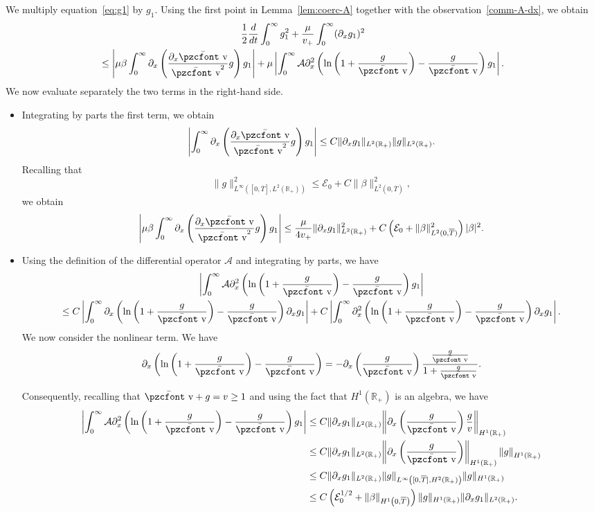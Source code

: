 \documentclass[10pt]{amsart}
\theoremstyle{definition}\newtheorem{defi}[theo]{Definition}\newtheorem{rema}[theo]{Remark}\newtheorem{exam}[theo]{Example}\newtheorem{exem}[theo]{Example}\newtheorem{nota}[theo]{Notation}
\newcommand{\mathpzc}[1]{\text{\pzcfont #1}}
\newcommand{\R}{\mathbb{R}}
\newcommand{\p}{\partial}
\newcommand{\bv}{\bar{\mathpzc{v}}}
\newcommand{\cA}{\mathcal A}
\newcommand{\cE}{\mathcal E}
\begin{document}
We multiply equation~\eqref{eq:g1} by $g_1$. Using the first point in Lemma~\ref{lem:coerc-A} together with the observation~\eqref{comm-A-dx}, we obtain
\begin{multline}\label{eq:energ-g1-0}
\frac{1}{2}\frac{d}{dt}\int_0^\infty g_1^2 + \frac{\mu}{v_+}\int_0^\infty (\p_x g_1)^2\\
\leq \left| \mu \beta \int_0^\infty\p_x \left(\frac{\p_x \bv}{\bv^2} g\right) g_1\right|
+ \mu \left| \int_0^\infty\cA \p_x^2 \left(\ln\left(1+ \frac{g}{\bv}\right) - \frac{g}{\bv}\right) g_1\right|.
\end{multline}
We now evaluate separately the two terms in the right-hand side.
\begin{itemize}
\item Integrating by parts the first term, we obtain
\[
\left| \int_0^\infty\p_x \left(\frac{\p_x \bv}{\bv^2} g\right) g_1\right|\leq C \|\p_x g_1\|_{L^2(\R_+)}\|g\|_{L^2(\R_+)}.
\]
Recalling that
\[
\|g\|_{L^\infty([0,\overline{T}], L^2(\R_+))}^2\leq \cE_0 + C\|\beta\|_{L^2\left(0, \overline{T}\right)}^2,
\]
we obtain
\[
\left| \mu \beta \int_0^\infty\p_x \left(\frac{\p_x \bv}{\bv^2} g\right) g_1\right|\leq \frac{\mu}{4v_+}\|\p_x g_1\|_{L^2(\R_+)}^2 + C\left(\cE_0 + \|\beta\|_{L^2(0, \overline{T})}^2\right)|\beta|^2.
\]

\item Using the definition of the differential operator $\cA$ and integrating by parts, we have
\begin{multline*}
\left| \int_0^\infty\cA \p_x^2 \left(\ln\left(1+ \frac{g}{\bv}\right) - \frac{g}{\bv}\right) g_1\right|\\
\leq C \left| \int_0^\infty \p_x \left(\ln\left(1+ \frac{g}{\bv}\right) - \frac{g}{\bv}\right) \p_x g_1\right|+ C \left| \int_0^\infty \p_x^2 \left(\ln\left(1+ \frac{g}{\bv}\right) - \frac{g}{\bv}\right) \p_x g_1\right|.
\end{multline*}
We now consider the nonlinear term. We have
\begin{equation} \label{diff-quadratic}
\p_x \left(\ln\left(1+ \frac{g}{\bv}\right) - \frac{g}{\bv}\right)= -\p_x \left(\frac{g}{\bv}\right) \frac{\frac{g}{\bv}}{1+ \frac{g}{\bv}}.
\end{equation}


Consequently, recalling that $\bv + g= v\geq 1$ {and using the fact that $H^1(\R_+)$ is an algebra,} we have
\begin{align*}
\left| \int_0^\infty\cA \p_x^2 \left(\ln\left(1+ \frac{g}{\bv}\right) - \frac{g}{\bv}\right) g_1\right|
&\leq C \|\p_x g_1\|_{L^2(\R_+)} {
\left\| \p_x \left(\frac{g}{\bv}\right) \frac{g}{v}\right\|_{H^1(\R_+)}}\\
&\leq C \|\p_x g_1\|_{L^2(\R_+)}{
\left\| \p_x \left(\frac{g}{\bv}\right) \right\|_{H^1(\R_+)} \left\|g\right\|_{H^1(\R_+)}} \\
&\leq C \|\p_x g_1\|_{L^2(\R_+)} \| g\|_{L^\infty\left([0, \overline{T}], H^2(\R_+)\right)}\| g\|_{H^1(\R_+)} \\
&\leq C \left(\cE_0^{1/2} + \|\beta\|_{H^1\left(0, \overline{T}\right)}\right)\| g\|_{H^1(\R_+)} \|\p_x g_1\|_{L^2(\R_+)}.
\end{align*}


\end{itemize}
\end{document}
